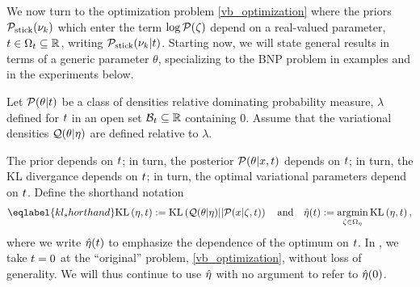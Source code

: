 We now turn to the optimization problem \eqref{vb_optimization} where the priors
$\mathcal{P}_{\mathrm{stick}}(\nu_{k})$ which enter the term $\log \mathcal{P}(\zeta)$ depend on a real-valued
parameter, $t \in \Omega_{t} \subseteq \mathbb{R}$, writing $\mathcal{P}_{\mathrm{stick}}(\nu_{k} \vert
t)$.  Starting now, we will state general results in terms of a generic
parameter $\theta$, specializing to the BNP problem in examples and in the
experiments below.

\begin{defn}
%
Let $\mathcal{P}(\theta \vert t)$ be a class of densities relative dominating
probability measure, $\lambda$ defined for $t$ in an open set $\mathcal{B}_t
\subseteq \mathbb{R}$ containing $0$.  Assume that the variational densities
$\mathcal{Q}(\theta \vert \eta)$ are defined relative to $\lambda$.
%
\end{defn}

The prior depends on $t$; in turn, the posterior $\mathcal{P}(\theta \vert x, t)$
depends on $t$; in turn, the KL divergance depends on $t$; in turn, the
optimal variational parameters depend on $t$.  Define the shorthand notation
%
\begin{align}\eqlabel{kl_shorthand}
%
\KL{\eta, \t} := \KL{\q(\theta \vert \eta) || \p(\x \vert \zeta, \t)}
\mathand
\etaopt(\t) := \argmin_{\zeta \in \etadom} \KL{\eta, \t},
%
\end{align}
%
where we write $\hat\eta(t)$ to emphasize the dependence of the optimum on $t$.
In , we take $t = 0$ at the ``original'' problem,
\eqref{vb_optimization}, without loss of generality.  We will thus continue to
use $\hat\eta$ with no argument to refer to $\hat\eta(0)$.


